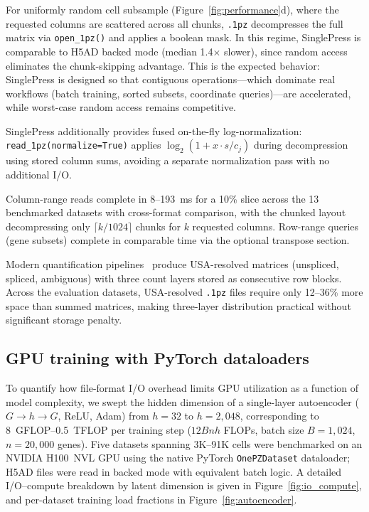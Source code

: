 \documentclass[10pt,twocolumn,letterpaper]{article}
\begin{document}
For uniformly random cell subsample (Figure~\ref{fig:performance}d), where the requested columns are scattered across all chunks, \texttt{.1pz} decompresses the full matrix via \texttt{open\_1pz()} and applies a boolean mask.
In this regime, SinglePress is comparable to H5AD backed mode (median 1.4$\times$ slower), since random access eliminates the chunk-skipping advantage.
This is the expected behavior: SinglePress is designed so that contiguous operations---which dominate real workflows (batch training, sorted subsets, coordinate queries)---are accelerated, while worst-case random access remains competitive.

SinglePress additionally provides fused on-the-fly log-normalization: \texttt{read\_1pz(normalize=True)} applies $\log_2(1 + x \cdot s / c_j)$ during decompression using stored column sums, avoiding a separate normalization pass with no additional I/O.

Column-range reads complete in 8--193~ms for a 10\% slice across the 13 benchmarked datasets with cross-format comparison, with the chunked layout decompressing only $\lceil k / 1024 \rceil$ chunks for $k$ requested columns.
Row-range queries (gene subsets) complete in comparable time via the optional transpose section.

Modern quantification pipelines~\cite{he2022alevin} produce USA-resolved matrices (unspliced, spliced, ambiguous) with three count layers stored as consecutive row blocks.
Across the evaluation datasets, USA-resolved \texttt{.1pz} files require only 12--36\% more space than summed matrices, making three-layer distribution practical without significant storage penalty.

\subsection{GPU training with PyTorch dataloaders}

To quantify how file-format I/O overhead limits GPU utilization as a function of model complexity, we swept the hidden dimension of a single-layer autoencoder ($G \to h \to G$, ReLU, Adam) from $h = 32$ to $h = 2{,}048$, corresponding to 8~GFLOP--0.5~TFLOP per training step ($12 B n h$ FLOPs, batch size $B = 1{,}024$, $n = 20{,}000$ genes).
Five datasets spanning 3K--91K cells were benchmarked on an NVIDIA H100~NVL GPU using the native PyTorch \texttt{OnePZDataset} dataloader; H5AD files were read in backed mode with equivalent batch logic.
A detailed I/O--compute breakdown by latent dimension is given in Figure~\ref{fig:io_compute}, and per-dataset training load fractions in Figure~\ref{fig:autoencoder}.
\end{document}
